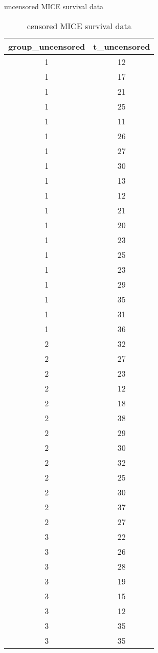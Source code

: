 \documentclass[]{article}
\begin{document}
\begin{table}
\caption{\label{tab:printData}uncensored MICE survival data}
\caption{\label{tab:printData}censored MICE survival data}

\begin{tabular}[t]{c|c}
\hline
group\_uncensored & t\_uncensored\\
\hline
1 & 12\\
\hline
1 & 17\\
\hline
1 & 21\\
\hline
1 & 25\\
\hline
1 & 11\\
\hline
1 & 26\\
\hline
1 & 27\\
\hline
1 & 30\\
\hline
1 & 13\\
\hline
1 & 12\\
\hline
1 & 21\\
\hline
1 & 20\\
\hline
1 & 23\\
\hline
1 & 25\\
\hline
1 & 23\\
\hline
1 & 29\\
\hline
1 & 35\\
\hline
1 & 31\\
\hline
1 & 36\\
\hline
2 & 32\\
\hline
2 & 27\\
\hline
2 & 23\\
\hline
2 & 12\\
\hline
2 & 18\\
\hline
2 & 38\\
\hline
2 & 29\\
\hline
2 & 30\\
\hline
2 & 32\\
\hline
2 & 25\\
\hline
2 & 30\\
\hline
2 & 37\\
\hline
2 & 27\\
\hline
3 & 22\\
\hline
3 & 26\\
\hline
3 & 28\\
\hline
3 & 19\\
\hline
3 & 15\\
\hline
3 & 12\\
\hline
3 & 35\\
\hline
3 & 35\\

\end{tabular}
\end{table}
\end{document}
